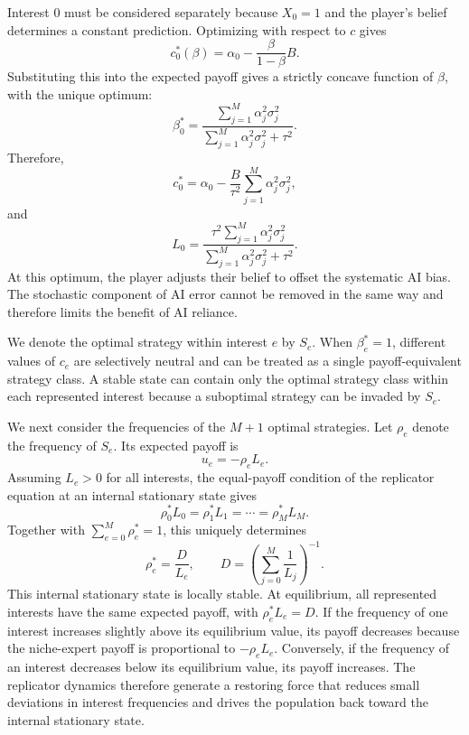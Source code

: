 \documentclass[12pt]{article}
\begin{document}
Interest 0 must be considered separately because $X_0=1$ and the player's belief determines a constant prediction. Optimizing with respect to $c$ gives
\begin{equation}
c_0^*(\beta)=\alpha_0-\frac{\beta}{1-\beta}B.
\end{equation}
Substituting this into the expected payoff gives a strictly concave function of $\beta$, with the unique optimum:
\begin{equation}
\beta_0^* = \frac{\sum_{j=1}^{M}\alpha_j^2\sigma_j^2}{\sum_{j=1}^{M}\alpha_j^2\sigma_j^2+\tau^2}.
\end{equation}
Therefore,
\begin{equation}
c_0^* = \alpha_0-\frac{B}{\tau^2}\sum_{j=1}^{M}\alpha_j^2\sigma_j^2,
\end{equation}
and
\begin{equation}
L_0 = \frac{\tau^2\sum_{j=1}^{M}\alpha_j^2\sigma_j^2}{\sum_{j=1}^{M}\alpha_j^2\sigma_j^2+\tau^2}.
\end{equation}
At this optimum, the player adjusts their belief to offset the systematic AI bias.
The stochastic component of AI error cannot be removed in the same way and therefore limits the benefit of AI reliance.

We denote the optimal strategy within interest $e$ by $S_e$. 
When $\beta_e^*=1$, different values of $c_e$ are selectively neutral and can be treated as a single payoff-equivalent strategy class. 
A stable state can contain only the optimal strategy class within each represented interest because a suboptimal strategy can be invaded by $S_e$.

We next consider the frequencies of the $M+1$ optimal strategies.
Let $\rho_e$ denote the frequency of $S_e$.
Its expected payoff is
\begin{equation}
u_e=-\rho_eL_e.
\end{equation}
Assuming $L_e>0$ for all interests, the equal-payoff condition of the replicator equation at an internal stationary state gives
\begin{equation}
\rho_0^*L_0 = \rho_1^*L_1 =\cdots = \rho_M^*L_M.
\end{equation}
Together with $\sum_{e=0}^{M}\rho_e^*=1$, this uniquely determines
\begin{equation}
\rho_e^* =\frac{D}{L_e},
\qquad D = \left(\sum_{j=0}^{M}\frac{1}{L_j}\right)^{-1}.
\end{equation}
This internal stationary state is locally stable.
At equilibrium, all represented interests have the same expected payoff, with $\rho_e^*L_e=D$.
If the frequency of one interest increases slightly above its equilibrium value, its payoff decreases because the niche-expert payoff is proportional to $-\rho_eL_e$.
Conversely, if the frequency of an interest decreases below its equilibrium value, its payoff increases.
The replicator dynamics therefore generate a restoring force that reduces small deviations in interest frequencies and drives the population back toward the internal stationary state.
\end{document}
